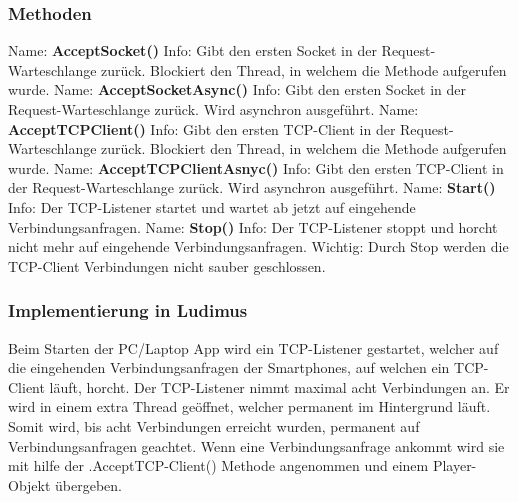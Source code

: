 \subsubsection{Methoden}
Name: \textbf{AcceptSocket()}
\newline
Info: Gibt den ersten Socket in der Request-Warteschlange zurück. Blockiert den Thread, in welchem die Methode aufgerufen wurde.
\newline \newline
Name: \textbf{AcceptSocketAsync()}
\newline
Info: Gibt den ersten Socket in der Request-Warteschlange zurück. Wird asynchron ausgeführt.
\newline \newline
Name: \textbf{AcceptTCPClient()}
\newline
Info: Gibt den ersten TCP-Client in der Request-Warteschlange zurück. Blockiert den Thread, in welchem die Methode aufgerufen wurde.
\newline \newline
Name: \textbf{AcceptTCPClientAsnyc()}
\newline
Info: Gibt den ersten TCP-Client in der Request-Warteschlange zurück. Wird asynchron ausgeführt.
\newline \newline
Name: \textbf{Start()}
\newline
Info: Der TCP-Listener startet und wartet ab jetzt auf eingehende Verbindungsanfragen.
\newline \newline
Name: \textbf{Stop()}
\newline
Info: Der TCP-Listener stoppt und horcht nicht mehr auf eingehende Verbindungsanfragen. Wichtig: Durch Stop werden die TCP-Client Verbindungen nicht sauber geschlossen.
\newline \newline
\subsubsection{Implementierung in Ludimus}
Beim Starten der PC/Laptop App wird ein TCP-Listener gestartet, welcher auf die eingehenden Verbindungsanfragen der Smartphones, auf welchen ein TCP-Client läuft, horcht. Der TCP-Listener nimmt maximal acht Verbindungen an. Er wird in einem extra Thread geöffnet, welcher permanent im Hintergrund läuft. Somit wird, bis acht Verbindungen erreicht wurden, permanent auf Verbindungsanfragen geachtet. Wenn eine Verbindungsanfrage ankommt wird sie mit hilfe der .AcceptTCP-Client() Methode angenommen und einem Player-Objekt übergeben.
